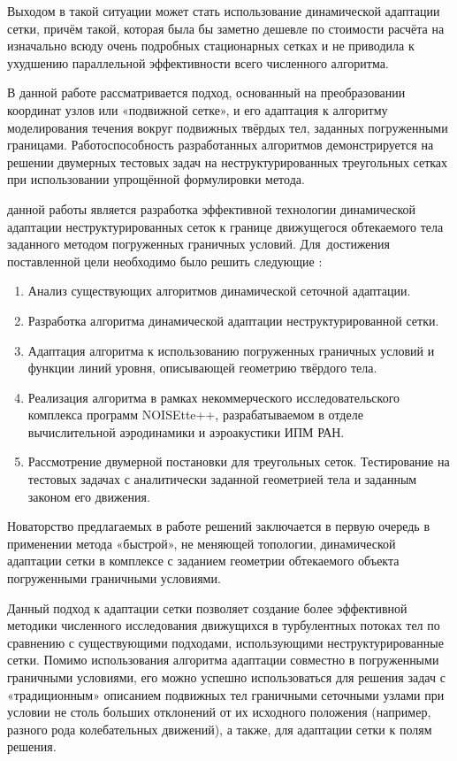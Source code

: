 Выходом в такой ситуации может стать использование динамической адаптации сетки, причём такой, которая была бы заметно дешевле по стоимости расчёта на изначально всюду очень подробных стационарных сетках и не приводила к ухудшению параллельной эффективности всего численного алгоритма. 

В данной работе рассматривается подход, основанный на преобразовании координат узлов или «подвижной сетке», и его адаптация к алгоритму моделирования течения вокруг подвижных твёрдых тел, заданных погруженными границами. Работоспособность разработанных алгоритмов демонстрируется на решении двумерных тестовых задач на неструктурированных треугольных сетках при использовании упрощённой формулировки метода.

{\aim} данной работы является разработка эффективной технологии динамической адаптации неструктурированных сеток к границе движущегося обтекаемого тела заданного методом погруженных граничных условий. Для~достижения поставленной цели необходимо было решить следующие {\tasks}:
\begin{enumerate}
	\item Анализ существующих алгоритмов динамической сеточной адаптации.
  \item  Разработка алгоритма динамической адаптации неструктурированной сетки. 
   \item Адаптация алгоритма к использованию погруженных граничных условий и функции линий уровня, описывающей геометрию твёрдого тела.
  \item Реализация алгоритма в рамках некоммерческого исследовательского комплекса программ NOISEtte++, разрабатываемом в отделе вычислительной аэродинамики и аэроакустики ИПМ РАН.
  \item Рассмотрение двумерной постановки для треугольных сеток. Тестирование на тестовых задачах с аналитически заданной геометрией тела и заданным законом его движения.
\end{enumerate}

{\novelty}
Новаторство предлагаемых в работе решений заключается в первую очередь в применении метода «быстрой», не меняющей топологии, динамической адаптации сетки в комплексе с заданием геометрии обтекаемого объекта погруженными граничными условиями. 

{\influence} Данный подход к адаптации сетки позволяет создание более эффективной методики численного исследования движущихся в турбулентных потоках тел по сравнению с существующими подходами, использующими неструктурированные сетки.  Помимо использования алгоритма адаптации совместно в погруженными граничными условиями, его можно успешно использоваться для решения задач с «традиционным» описанием подвижных тел граничными сеточными узлами при условии не столь
больших отклонений от их исходного положения (например, разного рода 
колебательных движений), а также, для адаптации сетки к полям решения.

